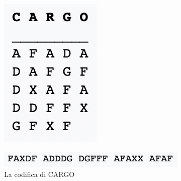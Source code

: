 \documentclass[11pt, oneside]{article}   	%
\begin{document}
\begin{figure}[H]
\begin{subfigure}[h]{0.2\linewidth}
\includegraphics[width=\linewidth]{pre}
\end{subfigure}
\hfill
\begin{subfigure}[h]{0.5\linewidth}
\includegraphics[width=\linewidth]{adfgx2}
\caption*{La codifica di CARGO}
\end{subfigure}
\hfill
\begin{subfigure}[h]{0.2\linewidth}

\end{subfigure}
\end{figure}
\end{document}

